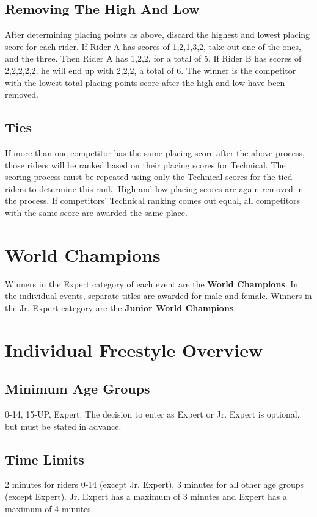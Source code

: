 \subsection{Removing The High And Low}
After determining placing points as above, discard the highest and lowest placing score for each rider.
If Rider A has scores of 1,2,1,3,2, take out one of the ones, and the three.
Then Rider A has 1,2,2, for a total of 5.
If Rider B has scores of 2,2,2,2,2, he will end up with 2,2,2, a total of 6.
The winner is the competitor with the lowest total placing points score after the high and low have been removed.

\subsection{Ties}
If more than one competitor has the same placing score after the above process, those riders will be ranked based on their placing scores for Technical.
The scoring process must be repeated using only the Technical scores for the tied riders to determine this rank.
High and low placing scores are again removed in the process.
If competitors' Technical ranking comes out equal, all competitors with the same score are awarded the same place.

\section{World Champions \label{sec:freestyle_world-champions}}
Winners in the Expert category of each event are the \textbf{World Champions}.
In the individual events, separate titles are awarded for male and female.
Winners in the Jr. Expert category are the \textbf{Junior World Champions}.

\newpage

\section{Individual Freestyle Overview}

\subsection{Minimum Age Groups}
 0-14, 15-UP, Expert.
The decision to enter as Expert or Jr. Expert is optional, but must be stated in advance.

\subsection{Time Limits}
2 minutes for riders 0-14 (except Jr. Expert), 3 minutes for all other age groups (except Expert).
Jr. Expert has a maximum of 3 minutes and Expert has a maximum of 4 minutes.

